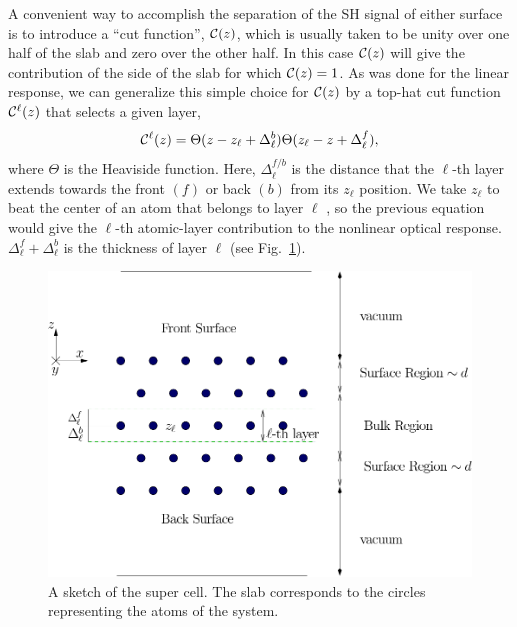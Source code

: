 \documentclass[floatfix,prb,aps,superscriptaddress,11pt,preprint,letterpaper]{revtex4}
\begin{document}
A convenient way to accomplish the separation of the SH signal of
either surface is to introduce a ``cut function'', ${\mathbf{\cal C}}(z)$, which is 
usually taken to be unity over one half of the slab and zero over 
the other half.\cite{reiningPRB94}
In this case ${\mathbf{\cal C}}(z)$ will give the contribution of the 
side of the slab for which ${\mathbf{\cal C}}(z)=1$. 
As was done for the linear response,\cite{mendozaPRB06}
we can generalize this 
simple choice for ${\mathbf{\cal C}}(z)$ by a top-hat cut function
${\mathbf{\cal C}}^\ell(z)$ that selects a given layer,
\begin{equation}
\label{sz}
{\mathbf{\cal C}}^\ell(z)=\Theta(z-z_\ell+\Delta_\ell^{b})  
            \Theta(z_\ell-z+\Delta_\ell^f),
\end{equation} 
where $\Theta$ is the Heaviside function. Here, $\Delta_\ell^{f/b}$
is the distance that the $\ell$-th layer extends towards the front
$(f)$ or back $(b)$ from its $z_\ell$ position. 
We take $z_\ell$ {\color{red} to be}at the center of an atom that 
belongs to layer $\ell${\color{red} , so the previous} 
equation would give the $\ell$-th atomic-layer 
contribution to the {\color{red} nonlinear} optical response.
$\Delta_\ell^f+\Delta_\ell^b$ is the thickness of layer $\ell$ 
(see Fig.~\ref{fslab}).
\begin{figure}[b]
\centering
\includegraphics[scale=.7]{images/slab}
\caption{A sketch of the super {\color{red} cell. 
The} slab corresponds to the
circles representing the atoms of the system.\label{fslab}} 
\end{figure}
\end{document}
